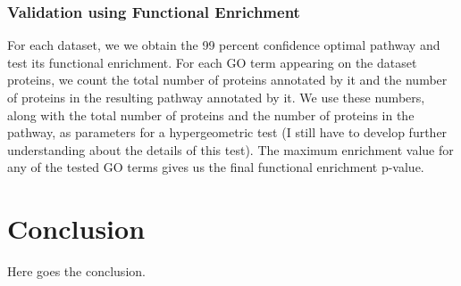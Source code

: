 \documentclass{ws-procs11x85}
\begin{document}
\subsubsection{Validation using Functional Enrichment}
 For each dataset, we we obtain the 99 percent confidence optimal pathway and
 test its functional enrichment. For each GO term appearing on the dataset
 proteins, we count the total number of proteins annotated by it and the
 number of proteins in the resulting pathway annotated by it. We use these
 numbers, along with the total number of proteins and the number of proteins in
 the pathway, as parameters for a hypergeometric test (I still have to develop
 further understanding about the details of this test). The maximum enrichment
 value for any of the tested GO terms gives us the final functional enrichment
 p-value.


\section{Conclusion}
Here goes the conclusion.




\end{document}
